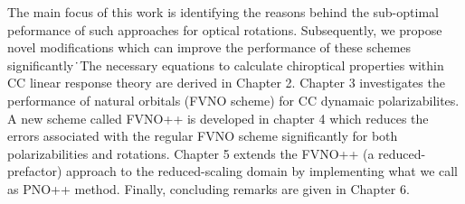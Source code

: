 The main focus of this work is identifying the 
reasons behind the sub-optimal peformance of such approaches for optical rotations. Subsequently, we propose novel modifications
which can improve the performance of these schemes significantly\.\
The necessary equations to calculate chiroptical properties within CC linear response theory are derived in 
Chapter 2. %
Chapter 3 investigates the performance of natural orbitals (FVNO scheme) for CC dynamaic polarizabilites.
A new scheme called FVNO++ is developed in chapter 4 which reduces the errors associated with the regular FVNO scheme
significantly for both polarizabilities and rotations. Chapter 5 extends the FVNO++ (a reduced-prefactor) approach to the reduced-scaling 
domain by implementing what we call as PNO++ method. Finally, concluding remarks are given in Chapter 6.




